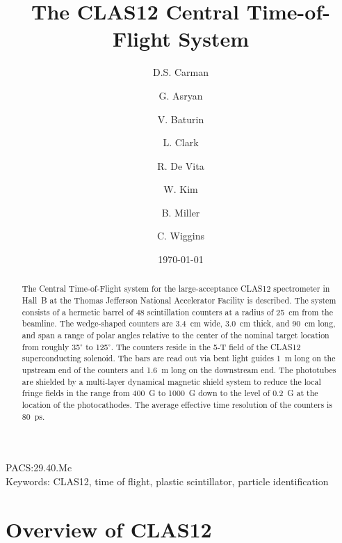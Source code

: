 \documentclass[3p,times,twocolumn]{elsarticle}
\begin{document}
\begin{frontmatter}

\title{The CLAS12 Central Time-of-Flight System}

\author[JLAB]{D.S. Carman}
\author[JLAB]{G. Asryan}
\author[JLAB]{V. Baturin}
\author[Glasgow]{L. Clark}
\author[INFN]{R. De Vita}
\author[KNU]{W. Kim} 
\author[JLAB]{B. Miller}
\author[JLAB]{C. Wiggins} 

\address[JLAB]{Thomas Jefferson National Accelerator Facility, Newport News, VA 23606, USA}
\address[Glasgow]{University of Glasgow, Glasgow G12 8QQ, United Kingdom}
\address[INFN]{INFN, Sezione di Genova, 16146 Genova, Italy}
\address[KNU]{Kyungpook National University, Daegu 41566, Republic of Korea} 

\date{\today}


\begin{abstract}
The Central Time-of-Flight system for the large-acceptance CLAS12 spectrometer in Hall~B at the
Thomas Jefferson National Accelerator Facility is described. The system consists of a hermetic barrel
of 48 scintillation counters at a radius of 25~cm from the beamline. The wedge-shaped counters are
3.4~cm wide, 3.0~cm thick, and 90~cm long, and span a range of polar angles relative to the center of the
nominal target location from roughly 35$^\circ$ to 125$^\circ$. The counters reside in the 5-T field of the
CLAS12 superconducting solenoid. The bars are read out via bent light guides 1~m long on the upstream
end of the counters and 1.6~m long on the downstream end. The phototubes are shielded by a multi-layer
dynamical magnetic shield system to reduce the local fringe fields in the range from 400~G to 1000~G
down to the level of 0.2~G at the location of the photocathodes. The average effective time resolution of
the counters is 80~ps.
\end{abstract}

\end{frontmatter}

PACS:29.40.Mc \\
Keywords: CLAS12, time of flight, plastic scintillator, particle identification

\section{Overview of CLAS12}
\end{document}
